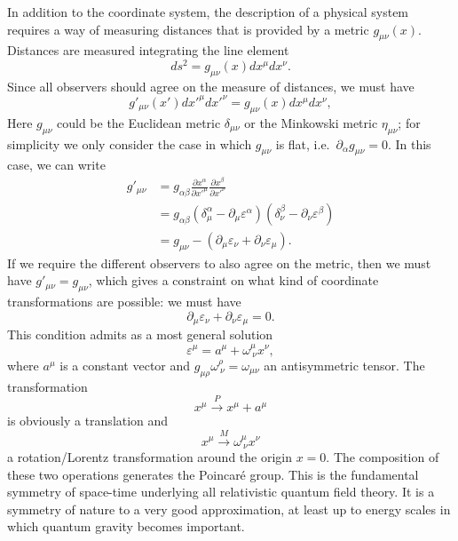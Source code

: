 \documentclass[a4paper,12pt]{article}
\numberwithin{equation}{section}
\begin{document}
In addition to the coordinate system, the description of a physical system requires a way of measuring distances that is provided by a metric $g_{\mu\nu}(x)$. Distances are measured integrating the line element
\begin{equation}
	ds^2 = g_{\mu\nu}(x) dx^\mu dx^\nu.
\end{equation}
Since all observers should agree on the measure of distances, we must have
\begin{equation}
	g'_{\mu\nu}(x') dx'^\mu dx'^\nu = g_{\mu\nu}(x) dx^\mu dx^\nu,
\end{equation}
Here $g_{\mu\nu}$ could be the Euclidean metric $\delta_{\mu\nu}$ or the Minkowski metric $\eta_{\mu\nu}$; for simplicity we only consider the case in which $g_{\mu\nu}$ is flat, i.e.~$\partial_\alpha g_{\mu\nu} = 0$.
In this case, we can write
\begin{equation}
\begin{aligned}
	g'_{\mu\nu} &= g_{\alpha\beta}
	\frac{\partial x^\alpha}{\partial x'^\mu}
	\frac{\partial x^\beta}{\partial x'^\nu}
	\\
	&= g_{\alpha\beta}
	\left( \delta^\alpha_\mu - \partial_\mu \varepsilon^\alpha \right)
	\left( \delta^\beta_\nu - \partial_\nu \varepsilon^\beta \right)
	\\
	&= g_{\mu\nu}
	- \left( \partial_\mu \varepsilon_\nu
	+ \partial_\nu \varepsilon_\mu \right).
\end{aligned}
\end{equation}
If we require the different observers to also agree on the metric, then  we must have $g'_{\mu\nu} = g_{\mu\nu}$, which gives a constraint on what kind of coordinate transformations are possible: we must have
\begin{equation}
	\partial_\mu \varepsilon_\nu
	+ \partial_\nu \varepsilon_\mu = 0.
\end{equation}
This condition admits as a most general solution
\begin{equation}
	\varepsilon^\mu = a^\mu + \omega^\mu_{~\nu} x^\nu,
\end{equation}
where $a^\mu$ is a constant vector and $g_{\mu\rho} \omega^\rho_{~\nu} = \omega_{\mu\nu}$ an antisymmetric tensor.
The transformation
\begin{equation}
	x^\mu \xrightarrow{P} x^\mu + a^\mu
\end{equation}
is obviously a translation and
\begin{equation}
	x^\mu \xrightarrow{M} \omega^\mu_{~\nu} x^\nu
\end{equation}
a rotation/Lorentz transformation around the origin $x = 0$. The composition of these two operations generates the Poincaré group.
This is the fundamental symmetry of space-time underlying all relativistic quantum field theory. It is a symmetry of nature to a very good approximation, at least up to energy scales in which quantum gravity becomes important.
\end{document}
